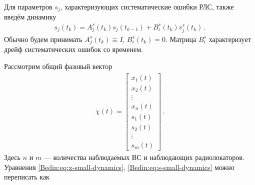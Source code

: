 Для параметров $s_j$, характеризующих систематические ошибки РЛС, также введём динамику 
\begin{gather}
  s_j(t_k) = A^s_j(t_k) s_j(t_{k - 1}) + B^s_i(t_k) v^s_j(t_k) \,. 
  \label{Bedin:eq:s-small-dynamics}
\end{gather}
Обычно будем принимать $A^s_j(t_k) \equiv I$, $B^s_i(t_k) = 0$. 
Матрица $B^s_i$ характеризует дрейф систематических ошибок со временем. 

Рассмотрим общий фазовый вектор 
\begin{gather}
  \chi(t) = 
  \begin{bmatrix}
    x_1(t) \\ x_2(t) \\ \vdots \\ x_n(t) \\ s_1(t) \\ s_2(t) \\ \vdots \\ s_m(t) 
  \end{bmatrix}
  \,. 
  \label{Bedin:eq:x-s-vector}
\end{gather}
Здесь $n$ и $m$ --- количества наблюдаемых ВС и наблюдающих радиолокаторов. 
Уравнения \eqref{Bedin:eq:x-small-dynamics}, \eqref{Bedin:eq:s-small-dynamics} 
можно переписать как
